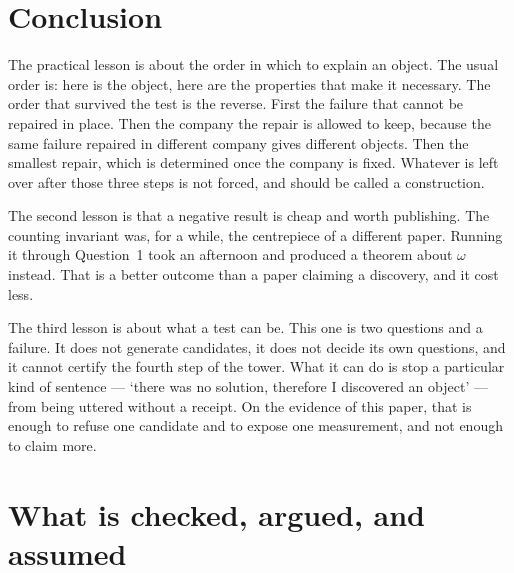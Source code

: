 \documentclass[12pt,a4paper]{article}
\begin{document}
\section{Conclusion}
\label{sec:conclusion}

The practical lesson is about the order in which to explain an object.  The usual
order is: here is the object, here are the properties that make it necessary.  The
order that survived the test is the reverse.  First the failure that cannot be
repaired in place.  Then the company the repair is allowed to keep, because the
same failure repaired in different company gives different objects.  Then the
smallest repair, which is determined once the company is fixed.  Whatever is left
over after those three steps is not forced, and should be called a construction.

The second lesson is that a negative result is cheap and worth publishing.  The
counting invariant was, for a while, the centrepiece of a different paper.  Running
it through Question~1 took an afternoon and produced a theorem about $\omega$
instead.  That is a better outcome than a paper claiming a discovery, and it cost
less.

The third lesson is about what a test can be.  This one is two questions and a
failure.  It does not generate candidates, it does not decide its own questions,
and it cannot certify the fourth step of the tower.  What it can do is stop a
particular kind of sentence --- `there was no solution, therefore I discovered an
object' --- from being uttered without a receipt.  On the evidence of this paper,
that is enough to refuse one candidate and to expose one measurement, and not
enough to claim more.

\appendix

\section{What is checked, argued, and assumed}
\end{document}
